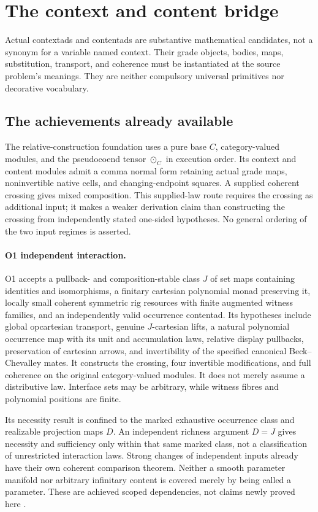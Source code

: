 \documentclass[11pt]{article}
\theoremstyle{definition}
\begin{document}
\section{The context and content bridge}
\label{sec:contextad}

Actual contextads and contentads are substantive mathematical candidates, not a synonym for a variable named context. Their grade objects, bodies, maps, substitution, transport, and coherence must be instantiated at the source problem's meanings. They are neither compulsory universal primitives nor decorative vocabulary.

\subsection{The achievements already available}

The relative-construction foundation uses a pure base $C$, category-valued modules, and the pseudocoend tensor $\odot_C$ in execution order. Its context and content modules admit a comma normal form retaining actual grade maps, noninvertible native cells, and changing-endpoint squares. A supplied coherent crossing gives mixed composition. This supplied-law route requires the crossing as additional input; it makes a weaker derivation claim than constructing the crossing from independently stated one-sided hypotheses. No general ordering of the two input regimes is asserted.

\paragraph{O1 independent interaction.}
O1 accepts a pullback- and composition-stable class $J$ of set maps containing identities and isomorphisms, a finitary cartesian polynomial monad preserving it, locally small coherent symmetric rig resources with finite augmented witness families, and an independently valid occurrence contentad. Its hypotheses include global opcartesian transport, genuine $J$-cartesian lifts, a natural polynomial occurrence map with its unit and accumulation laws, relative display pullbacks, preservation of cartesian arrows, and invertibility of the specified canonical Beck--Chevalley mates. It constructs the crossing, four invertible modifications, and full coherence on the original category-valued modules. It does not merely assume a distributive law. Interface sets may be arbitrary, while witness fibres and polynomial positions are finite.

Its necessity result is confined to the marked exhaustive occurrence class and realizable projection maps $D$. An independent richness argument $D=J$ gives necessity and sufficiency only within that same marked class, not a classification of unrestricted interaction laws. Strong changes of independent inputs already have their own coherent comparison theorem. Neither a smooth parameter manifold nor arbitrary infinitary content is covered merely by being called a parameter. These are achieved scoped dependencies, not claims newly proved here \cite{O1,Relative}.
\end{document}
